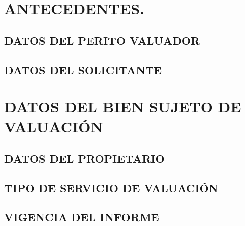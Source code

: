 \documentclass[10pt,letter]{report}
\begin{document}
\def\sectionautorefname{Inciso}
\def\subsectionautorefname{Inciso}


\thispagestyle{plain}
%

\newpage
\setcounter{page}{1}
\thispagestyle{fancy}
\tableofcontents

\newpage


\chapter{ANTECEDENTES.}\label{cap:1}
\thispagestyle{fancy}
\section{DATOS DEL PERITO VALUADOR}\label{sec:a}


\section{DATOS DEL SOLICITANTE}\label{sec:b}


\espacio{3cm}

\chapter{DATOS DEL BIEN SUJETO DE VALUACI\'ON}\label{cap:2}
\thispagestyle{fancy}
\setcounter{section}{2}
\section{DATOS DEL PROPIETARIO}\label{sec:c}


\section{TIPO DE SERVICIO DE VALUACI\'ON}\label{sec:d}


\section{VIGENCIA DEL INFORME}\label{sec:e}

\end{document}
